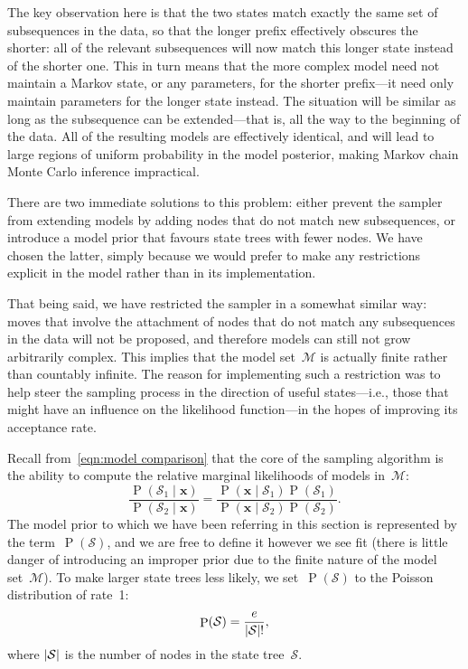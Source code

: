 \documentclass[12pt,a4paper]{article}
\newcommand\mc[1]{\mathcal{#1}}               %
\newcommand\ub[1]{\symbf{#1}}                 %
\DeclareMathOperator\Pb{P}                    %
\DeclarePairedDelimiter\abs{\lvert}{\rvert}   %
\begin{document}
The key observation here is that the two states match exactly the same set of
subsequences in the data, so that the longer prefix effectively obscures the
shorter: all of the relevant subsequences will now match this longer state
instead of the shorter one. This in turn means that the more complex model need
not maintain a Markov state, or any parameters, for the shorter prefix---it need
only maintain parameters for the longer state instead. The situation will be
similar as long as the subsequence can be extended---that is, all the way to the
beginning of the data. All of the resulting models are effectively identical,
and will lead to large regions of uniform probability in the model posterior,
making Markov chain Monte Carlo inference impractical.

There are two immediate solutions to this problem: either prevent the sampler
from extending models by adding nodes that do not match new subsequences, or
introduce a model prior that favours state trees with fewer nodes. We have
chosen the latter, simply because we would prefer to make any restrictions
explicit in the model rather than in its implementation.

That being said, we have restricted the sampler in a somewhat similar way: moves
that involve the attachment of nodes that do not match any subsequences in the
data will not be proposed, and therefore models can still not grow arbitrarily
complex. This implies that the model set~\(\mc{M}\) is actually finite rather
than countably infinite. The reason for implementing such a restriction was to
help steer the sampling process in the direction of useful states---i.e., those
that might have an influence on the likelihood function---in the hopes of
improving its acceptance rate.

Recall from~\eqref{eqn:model comparison} that the core of the sampling algorithm
is the ability to compute the relative marginal likelihoods of models
in~\(\mc{M}\):
\begin{equation*}
  \frac{\Pb(\mc{S}_1 \mid \ub{x})}{\Pb(\mc{S}_2 \mid \ub{x})} =
    \frac{\Pb(\ub{x} \mid \mc{S}_1) \Pb(\mc{S}_1)}
    {\Pb(\ub{x} \mid \mc{S}_2) \Pb(\mc{S}_2)}.
\end{equation*}
The model prior to which we have been referring in this section is represented
by the term~\(\Pb(\mc{S})\), and we are free to define it however we see fit
(there is little danger of introducing an improper prior due to the finite
nature of the model set~\(\mc{M}\)). To make larger state trees less likely, we
set~\(\Pb(\mc{S})\) to the Poisson distribution of rate~1:
\begin{equation*}
  \Pb(\mc{S}) = \frac{e}{\abs{\mc{S}}!},
\end{equation*}
where \(\abs{\mc{S}}\) is the number of nodes in the state tree~\(\mc{S}\).
\end{document}
